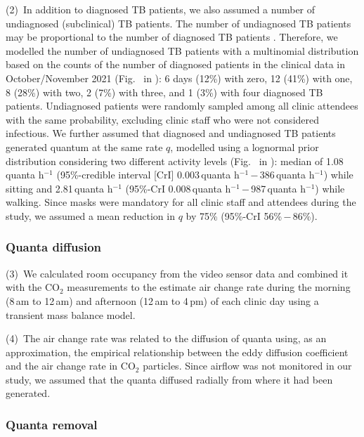 \documentclass[fleqn,11pt]{wlscirep}
\begin{document}
(2)~In addition to diagnosed TB patients, we also assumed a number of undiagnosed (subclinical) TB patients. The number of undiagnosed TB patients may be proportional to the number of diagnosed TB patients \cite{Berhanu2023CID,Moyo2022LancetID,Patterson2024PNAS}. Therefore, we modelled the number of undiagnosed TB patients with a multinomial distribution based on the counts of the number of diagnosed patients in the clinical data in October/November 2021 (Fig.~ in \supp): 6 days (12\%) with zero, 12 (41\%) with one, 8 (28\%) with two, 2 (7\%) with three, and 1 (3\%) with four diagnosed TB patients. Undiagnosed patients were randomly sampled among all clinic attendees with the same probability, excluding clinic staff who were not considered infectious. We further assumed that diagnosed and undiagnosed TB patients generated quantum at the same rate $q$, modelled using a lognormal prior distribution considering two different activity levels (Fig.~ in \supp): median of 1.08\,quanta h$^{-1}$ (95\%-credible interval [CrI] 0.003\,quanta h$^{-1}$\,$-$\,386\,quanta h$^{-1}$) while sitting and 2.81\,quanta h$^{-1}$ (95\%-CrI 0.008\,quanta h$^{-1}$\,$-$\,987\,quanta h$^{-1}$) while walking\cite{Mikszewski2021GF,Buonanno2020EI,Banholzer2024PGPH}. Since masks were mandatory for all clinic staff and attendees during the study, we assumed a mean reduction in $q$ by 75\% (95\%-CrI 56\%\,$-$\,86\%)\cite{Dharmadhikari2012AJRCCM,McCreesh2021BMJGlobalHealth}.

\subsubsection*{Quanta diffusion}

(3)~We calculated room occupancy from the video sensor data and combined it with the CO$_2$ measurements to the estimate air change rate during the morning (8\,am to 12\,am) and afternoon (12\,am to 4\,pm) of each clinic day using a transient mass balance model\cite{Batterman2017IJERPH}. 

(4)~The air change rate was related to the diffusion of quanta using, as an approximation, the empirical relationship between the eddy diffusion coefficient and the air change rate in CO$_2$ particles\cite{Cheng2011EnvSciTech,Foat2020BE}. Since airflow was not monitored in our study, we assumed that the quanta diffused radially from where it had been generated. 

\subsubsection*{Quanta removal}
\end{document}
